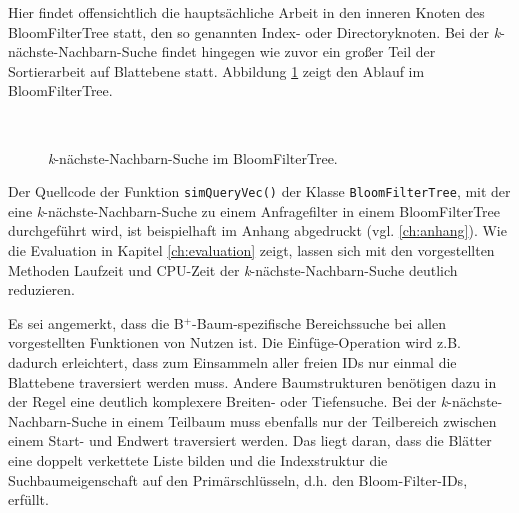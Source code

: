 Hier findet offensichtlich die hauptsächliche Arbeit in den inneren Knoten des BloomFilterTree statt, den so genannten Index- oder Directoryknoten. Bei der \textit{k}-nächste-Nachbarn-Suche findet hingegen wie zuvor ein großer Teil der Sortierarbeit auf Blattebene statt. Abbildung \ref{fig:pic8} zeigt den Ablauf im BloomFilterTree.
\begin{figure}[hpbt]
  \centering
  \\
  \caption[\textit{k}-nächste-Nachbarn-Suche im BloomFilterTree]{\textit{k}-nächste-Nachbarn-Suche im BloomFilterTree.}\label{fig:pic8}
\end{figure}
Der Quellcode der Funktion \mbox{\texttt{simQueryVec()}} der Klasse \texttt{BloomFilterTree}, mit der eine \textit{k}-nächste-Nachbarn-Suche zu einem Anfragefilter in einem BloomFilterTree durchgeführt wird, ist beispielhaft im Anhang abgedruckt (vgl. \ref{ch:anhang}). Wie die Evaluation in Kapitel \ref{ch:evaluation} zeigt, lassen sich mit den vorgestellten Methoden Laufzeit und CPU-Zeit der \textit{k}-nächste-Nachbarn-Suche deutlich reduzieren. 

Es sei angemerkt, dass die B$^+$-Baum-spezifische Bereichssuche bei allen vorgestellten Funktionen von Nutzen ist. Die Einfüge-Operation wird z.B. dadurch erleichtert, dass zum Einsammeln aller freien IDs nur einmal die Blattebene traversiert werden muss. Andere Baumstrukturen benötigen dazu in der Regel eine deutlich komplexere Breiten- oder Tiefensuche. Bei der \textit{k}-nächste-Nachbarn-Suche in einem Teilbaum muss ebenfalls nur der Teilbereich zwischen einem Start- und Endwert traversiert werden. Das liegt daran, dass die Blätter eine doppelt verkettete Liste bilden und die Indexstruktur die Suchbaumeigenschaft auf den Primärschlüsseln, d.h. den Bloom-Filter-IDs, erfüllt.  
